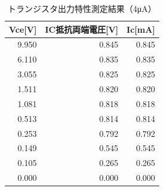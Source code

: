\documentclass[titlepage]{jarticle}
\begin{document}
\begin{table}[htbp]
    \caption{トランジスタ出力特性測定結果（4μA）}
    \begin{center}
        \begin{tabular}{r|r|r}
            \hline\hline
            \multicolumn{1}{l|}{Vce[V]} & \multicolumn{1}{l|}{IC抵抗両端電圧[V]} & \multicolumn{1}{l}{Ic[mA]} \\ \hline
            9.950                       & 0.845                                  & 0.845                      \\ \hline
            6.110                       & 0.835                                  & 0.835                      \\ \hline
            3.055                       & 0.825                                  & 0.825                      \\ \hline
            1.511                       & 0.820                                  & 0.820                      \\ \hline
            1.081                       & 0.818                                  & 0.818                      \\ \hline
            0.513                       & 0.814                                  & 0.814                      \\ \hline
            0.253                       & 0.792                                  & 0.792                      \\ \hline
            0.149                       & 0.545                                  & 0.545                      \\ \hline
            0.105                       & 0.265                                  & 0.265                      \\ \hline
            0.000                       & 0.000                                  & 0.000                      \\ \hline
        \end{tabular}
    \end{center}
    \label{トランジスタ出力特性測定結果（4μA）}
\end{table}
\end{document}
